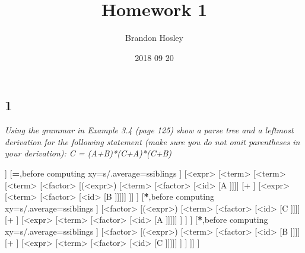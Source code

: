 \documentclass[a4paper,man,natbib]{apa6}
\title{Homework 1}
\author{Brandon Hosley}
\date{2018 09 20}
\affiliation{Brian-Thomas Rogers}
\begin{document}
\maketitle
\singlespacing
\subsection{1}
\emph{Using the grammar in Example 3.4 (page 125) show a parse tree and a leftmost derivation for the following statement (make sure you do not omit parentheses in your derivation): C = (A+B)*(C+A)*(C+B)}
\\
\begin{forest}
[<assign>
	[<id> [A ]]
	[\textbf{=},before computing xy={s/.average={s}{siblings}} ] 
	[<expr> [<term>
		[<term> 
			[<term> 
				[<factor> [(<expr>)
					[<term> [<factor> [<id> [A ]]]]
					[+ ] 
					[<expr> [<term> [<factor> [<id> [B ]]]]]
				]]
			]
			[\textbf{*},before computing xy={s/.average={s}{siblings}} ]
			[<factor> 
				[(<expr>)
					[<term> [<factor> [<id> [C ]]]]
					[+ ] 
					[<expr> [<term> [<factor> [<id> [A ]]]]]
				]
			]
		]
		[\textbf{*},before computing xy={s/.average={s}{siblings}} ]
		[<factor> 
			[(<expr>)
				[<term> [<factor> [<id> [B ]]]]
				[+ ] 
				[<expr> [<term> [<factor> [<id> [C ]]]]]
			]
		]
	]]
]
\end{forest}

\clearpage
\end{document}
